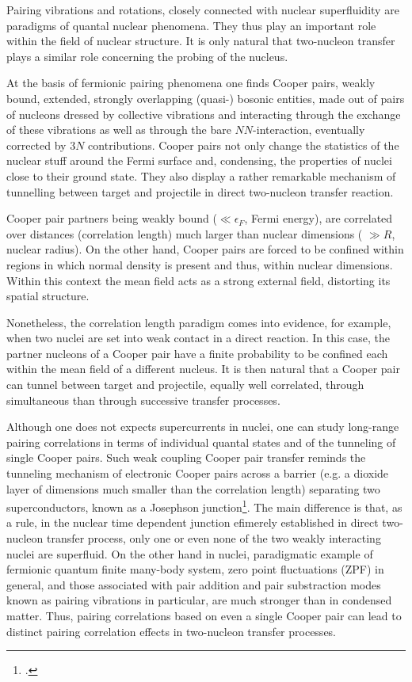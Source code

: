 Pairing vibrations and rotations, closely connected with nuclear superfluidity are  paradigms of quantal nuclear phenomena. They thus play an important  role within the field of nuclear structure. It is only natural that two-nucleon transfer plays a similar role concerning the probing of the nucleus.

 
At the basis of fermionic pairing phenomena one finds Cooper pairs, weakly bound, extended, strongly overlapping (quasi-) bosonic entities, made out of pairs of nucleons dressed by collective vibrations and interacting through the exchange of these vibrations as well as through the bare $NN$-interaction, eventually corrected by $3N$ contributions.
Cooper pairs not only change the statistics of the nuclear stuff around the Fermi surface and, condensing, the properties of nuclei close to their ground state. They also display a rather remarkable mechanism of tunnelling between  target and projectile in  direct two-nucleon transfer reaction.


Cooper pair partners being weakly bound ($\ll \epsilon_F$, Fermi energy), are correlated over distances (correlation length) much larger than nuclear dimensions ( $\gg R$, nuclear radius). On the other hand, Cooper pairs are forced to be confined within regions in which normal density is present and thus, within nuclear dimensions. Within this context the mean field acts as a strong external field,  distorting its spatial structure.

 Nonetheless, the correlation length paradigm comes into evidence, for example, when two nuclei are set into weak contact in a direct reaction. In this case,  the partner nucleons of a Cooper pair have a finite probability to be confined each within the mean field of a different nucleus. It is then natural that a Cooper pair can tunnel between target and projectile, equally well correlated, through simultaneous than through successive transfer processes.
 
 
  Although one does not expects supercurrents in nuclei, one can study long-range pairing correlations in terms of individual quantal states and of the tunneling of single Cooper pairs. Such weak coupling Cooper pair transfer reminds  the tunneling mechanism of electronic Cooper pairs across a barrier (e.g. a dioxide layer of dimensions much smaller than the correlation length) separating two superconductors, known as a Josephson junction\footnote{\cite{Josephson:62,Anderson:64b}.}. The main difference is that, as a rule, in the nuclear time dependent junction efimerely established in  direct two-nucleon transfer process, only one or even none of the two weakly interacting nuclei are superfluid. 
  On the other hand in nuclei, paradigmatic example of fermionic quantum  finite many-body system, zero point fluctuations  (ZPF) in general, and those associated with pair addition and pair substraction modes known as pairing vibrations in particular, are much stronger than in condensed matter. Thus, pairing correlations based on even  a single Cooper pair can lead to distinct pairing correlation effects in two-nucleon transfer processes. 
  
